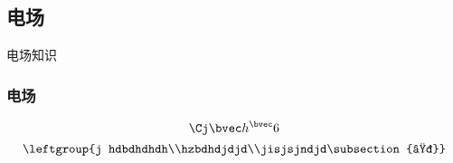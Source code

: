 \subsection{电场}
电场知识
\subsubsection{电场}
\begin{equation}
\Cj \bvec h^\bvec 6
\end{equation}
\begin{equation}
\leftgroup{j
hdbdhdhdh\\hzbdhdjdjd\\jisjsjndjd\subsection{☞}}
\end{equation}

